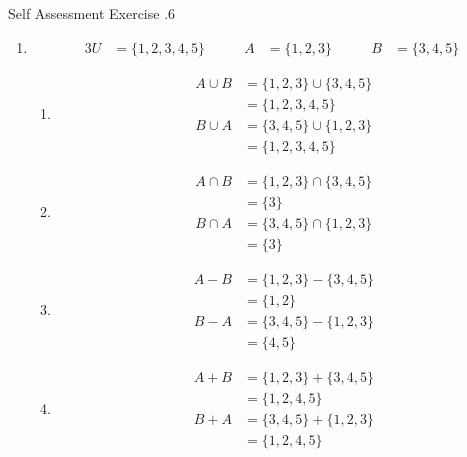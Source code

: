 \documentclass[../notes.tex]{subfiles}
\begin{document}
      \begin{exercise}{Self Assessment Exercise \thechapter.6}
        \begin{enumerate}
          \item \moveup
            \begin{alignat*}{3}
              U &= \{1, 2, 3, 4, 5\} \qquad & A &= \{1, 2, 3\} \qquad & B &= \{3, 4, 5\}
            \end{alignat*}
            \begin{enumerate}[label=(\alph*)]
              \item \moveup
                \begin{align*}
                  A \cup B &= \{1, 2, 3\} \cup \{3, 4, 5\}\\
                  &= \{1, 2, 3, 4, 5\}\\
                  B \cup A &= \{3, 4, 5\} \cup \{1, 2, 3\}\\
                  &= \{1, 2, 3, 4, 5\}
                \end{align*}
              \item \moveup
                \begin{align*}
                  A \cap B &= \{1, 2, 3\} \cap \{3, 4, 5\}\\
                  &= \{3\}\\
                  B \cap A &= \{3, 4, 5\} \cap \{1, 2, 3\}\\
                  &= \{3\}
                \end{align*}
              \item \moveup
                \begin{align*}
                  A - B &= \{1, 2, 3\} - \{3, 4, 5\}\\
                  &= \{1, 2\}\\
                  B - A &= \{3, 4, 5\} - \{1, 2, 3\}\\
                  &= \{4, 5\}
                \end{align*}
              \item \moveup
                \begin{align*}
                  A + B &= \{1, 2, 3\} + \{3, 4, 5\}\\
                  &= \{1, 2, 4 , 5\}\\
                  B + A &= \{3, 4, 5\} + \{1, 2, 3\}\\
                  &= \{1, 2, 4, 5\}
                \end{align*}
            \end{enumerate}

\end{enumerate}
\end{exercise}
\end{document}
